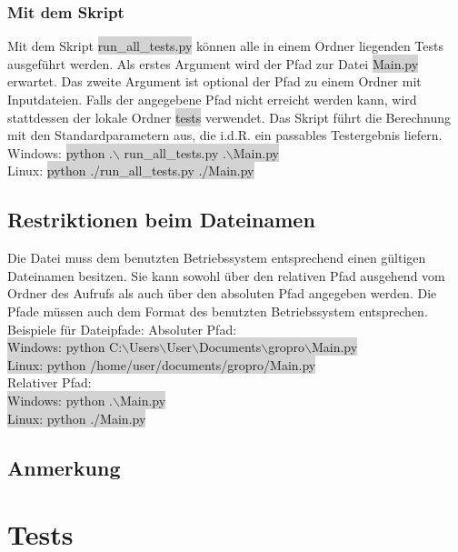 \documentclass[a4paper,11pt]{article}
\begin{document}
{\subsubsection{Mit dem Skript}
Mit dem Skript \colorbox{lightgray}{run\_all\_tests.py} k\"onnen alle in einem Ordner liegenden Tests ausgef\"uhrt werden. Als erstes Argument wird der Pfad zur Datei \colorbox{lightgray}{Main.py} erwartet. Das zweite Argument
ist optional der Pfad zu einem Ordner mit Inputdateien. Falls der angegebene Pfad nicht erreicht werden kann, wird stattdessen der lokale Ordner \colorbox{lightgray}{tests}
verwendet. Das Skript f\"uhrt die Berechnung mit den Standardparametern aus, die i.d.R. ein passables Testergebnis liefern.\\
Windows: \colorbox{lightgray}{python .$\backslash$ run\_all\_tests.py .$\backslash$Main.py}\\
Linux: \colorbox{lightgray}{python ./run\_all\_tests.py ./Main.py}\\
\subsection{Restriktionen beim Dateinamen}
Die Datei muss dem benutzten Betriebssystem entsprechend einen g\"ultigen Dateinamen besitzen.
Sie kann sowohl \"uber den relativen Pfad ausgehend vom Ordner des Aufrufs als auch \"uber den absoluten Pfad angegeben werden.
Die Pfade m\"ussen auch dem Format des benutzten Betriebssystem entsprechen.
Beispiele f\"ur Dateipfade:
\vspace{3mm}
Absoluter Pfad:\\
\colorbox{lightgray}{Windows: python \glqq C:$\backslash$Users$\backslash$User$\backslash$Documents$\backslash$gropro$\backslash$Main.py\grqq{}}\\
\colorbox{lightgray}{Linux: python /home/user/documents/gropro/Main.py}\\
Relativer Pfad:\\
\colorbox{lightgray}{Windows: python .$\backslash$Main.py}\\
\colorbox{lightgray}{Linux: python ./Main.py}


\subsection{Anmerkung}

\section{Tests}

}
\end{document}
